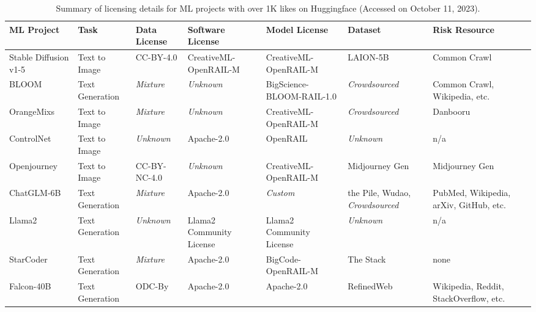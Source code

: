 \begin{table}[h]
  \caption{Summary of licensing details for ML projects with over 1K likes on Huggingface (Accessed on October 11, 2023). }
  \footnotesize
  \label{tab:MLP}
  \begin{tabular}{|p{2.1cm}|p{1.6cm}|p{2cm}|p{2.75cm}|p{3cm}|p{1.7cm}|p{2cm}|}
      \hline
      \rowcolor[gray]{.8}
      \textbf{ML Project} & \textbf{Task} & \textbf{Data License} & \textbf{Software License} & \textbf{Model License} & \textbf{Dataset} & \textbf{Risk Resource} \\ \hline
      
      Stable Diffusion v1-5 & Text to Image & CC-BY-4.0 & CreativeML-OpenRAIL-M & CreativeML-OpenRAIL-M & LAION-5B & Common Crawl \\ \hline
      
      BLOOM & Text Generation & \textit{Mixture} & \textit{Unknown} & BigScience-BLOOM-RAIL-1.0 & \textit{Crowdsourced} & Common Crawl, \newline Wikipedia, etc. \\ \hline

      OrangeMixs & Text to Image & \textit{Mixture} & \textit{Unknown} & CreativeML-OpenRAIL-M & \textit{Crowdsourced} & Danbooru \\ \hline

      ControlNet & Text to Image &  \textit{Unknown} & Apache-2.0 & OpenRAIL & \textit{Unknown} & n/a \\ \hline

      Openjourney & Text to Image &  CC-BY-NC-4.0 & \textit{Unknown} & CreativeML-OpenRAIL-M & Midjourney Gen & Midjourney Gen \\ \hline

      ChatGLM-6B & Text Generation &  \textit{Mixture} & Apache-2.0 & \textit{Custom} & the Pile, Wudao, \newline \textit{Crowdsourced} & PubMed,  Wikipedia, \newline arXiv, GitHub, etc. \\ \hline

      Llama2 & Text Generation &  \textit{Unknown} & Llama2 Community License & Llama2 Community License & \textit{Unknown} & n/a \\ \hline

      StarCoder & Text Generation &  \textit{Mixture} & Apache-2.0 & BigCode-OpenRAIL-M & The Stack & none \\ \hline

      Falcon-40B & Text Generation & ODC-By & Apache-2.0 & Apache-2.0 & RefinedWeb & Wikipedia, Reddit, \newline StackOverflow, etc. \\ \hline


\end{tabular}
\end{table}
